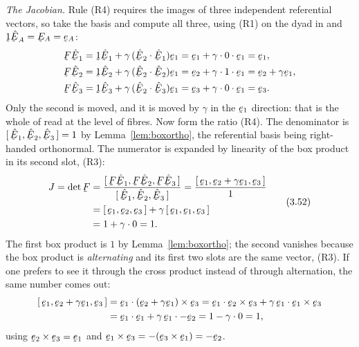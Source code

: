 \smallskip
\noindent\emph{The Jacobian.} Rule (R4) requires the images of three
independent referential vectors, so take the basis and compute all three,
using (R1) on the dyad in  and $\shift\hbE_{A}=\bE_{A}=\be_{A}$:
\[
\begin{aligned}
   \bF\hbE_{1}&=\shift\hbE_{1}+\gamma\,(\ip{\hbE_{2}}{\hbE_{1}})\be_{1}
     =\be_{1}+\gamma\cdot0\cdot\be_{1}=\be_{1},\\
   \bF\hbE_{2}&=\shift\hbE_{2}+\gamma\,(\ip{\hbE_{2}}{\hbE_{2}})\be_{1}
     =\be_{2}+\gamma\cdot1\cdot\be_{1}=\be_{2}+\gamma\be_{1},\\
   \bF\hbE_{3}&=\shift\hbE_{3}+\gamma\,(\ip{\hbE_{2}}{\hbE_{3}})\be_{1}
     =\be_{3}+\gamma\cdot0\cdot\be_{1}=\be_{3}.
\end{aligned}
\]
Only the second is moved, and it is moved by $\gamma$ in the $\be_{1}$
direction: that is the whole of  read at the level of fibres. Now
form the ratio (R4). The denominator is
$\tbox{\hbE_{1}}{\hbE_{2}}{\hbE_{3}}=1$ by
Lemma~\ref{lem:boxortho}, the referential basis being right-handed
orthonormal. The numerator is expanded by linearity of the box product in
its second slot, (R3):
\begin{equation}
\begin{aligned}
   J=\det\bF
   &=\frac{\tbox{\bF\hbE_{1}}{\bF\hbE_{2}}{\bF\hbE_{3}}}
          {\tbox{\hbE_{1}}{\hbE_{2}}{\hbE_{3}}}
    =\frac{\tbox{\be_{1}}{\be_{2}+\gamma\be_{1}}{\be_{3}}}{1}\\
   &=\tbox{\be_{1}}{\be_{2}}{\be_{3}}
     +\gamma\,\tbox{\be_{1}}{\be_{1}}{\be_{3}}\\
   &=1+\gamma\cdot0=1 .
\end{aligned}
   \tag{3.52}\label{eq:3.52}
\end{equation}
The first box product is $1$ by Lemma~\ref{lem:boxortho}; the second
vanishes because the box product is \emph{alternating} and its first two
slots are the same vector, (R3). If one prefers to see it through the cross
product instead of through alternation, the same number comes out:
\[
\begin{aligned}
   \tbox{\be_{1}}{\be_{2}+\gamma\be_{1}}{\be_{3}}
   &=\ip{\be_{1}}{(\be_{2}+\gamma\be_{1})\times\be_{3}}
    =\ip{\be_{1}}{\be_{2}\times\be_{3}}
     +\gamma\,\ip{\be_{1}}{\be_{1}\times\be_{3}}\\
   &=\ip{\be_{1}}{\be_{1}}+\gamma\,\ip{\be_{1}}{-\be_{2}}
    =1-\gamma\cdot0=1 ,
\end{aligned}
\]
using $\be_{2}\times\be_{3}=\be_{1}$ and
$\be_{1}\times\be_{3}=-(\be_{3}\times\be_{1})=-\be_{2}$.

